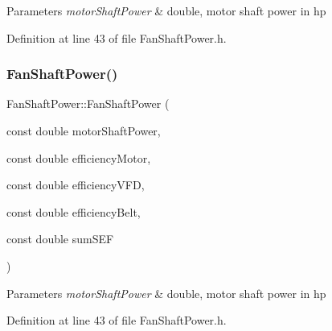 \begin{DoxyParams}{Parameters}
{\em motor\+Shaft\+Power} & double, motor shaft power in hp \\
\hline
\end{DoxyParams}


Definition at line 43 of file Fan\+Shaft\+Power.\+h.

\mbox{\label{class_fan_shaft_power_afe665bc2baf1a876d265ebc9129f70e2}} 
\subsubsection{\texorpdfstring{Fan\+Shaft\+Power()}{FanShaftPower()}\hspace{0.1cm}{\footnotesize\ttfamily [2/3]}}
{\footnotesize\ttfamily Fan\+Shaft\+Power\+::\+Fan\+Shaft\+Power (\begin{DoxyParamCaption}\item[{const double}]{motor\+Shaft\+Power,  }\item[{const double}]{efficiency\+Motor,  }\item[{const double}]{efficiency\+V\+FD,  }\item[{const double}]{efficiency\+Belt,  }\item[{const double}]{sum\+S\+EF }\end{DoxyParamCaption})\hspace{0.3cm}{\ttfamily [inline]}}


\begin{DoxyParams}{Parameters}
{\em motor\+Shaft\+Power} & double, motor shaft power in hp \\
\hline
\end{DoxyParams}


Definition at line 43 of file Fan\+Shaft\+Power.\+h.

\mbox{\label{class_fan_shaft_power_afe665bc2baf1a876d265ebc9129f70e2}} 
